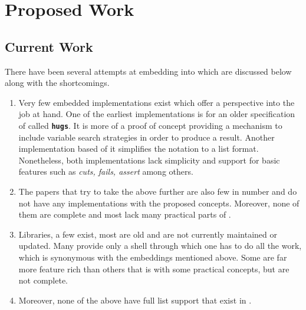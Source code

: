 \documentclass[proposal.tex]{subfiles}
\begin{document}
\chapter{Proposed Work}\label{chap:proposedWork}
\section{Current Work}

There have been several attempts at embedding  into  which are discussed below along with the 
shortcomings.

\begin{enumerate}
\item Very few embedded implementations exist which offer a perspective into the job at hand. One of the earliest implementations 
\cite{website:mini-prolog-hugs98} is for an older specification of  called  
\texttt{\bfseries{hugs}}. It is more of a proof of concept providing a mechanism to include variable search strategies in order to produce 
a result. Another implementation \cite{website:takashi-workplace} based of it simplifies the notation to a list format. Nonetheless, both 
implementations lack simplicity and support for basic  features such as \textit{cuts, fails, assert} among others.   

\begin{comment}
\item Only two embeddings exist, one of them is old and made for \texttt{\bfseries{hugs}} a functional programming system based on the 
\progLang{Haskell 98} specification. It is complex and also lacks a lot of \progLang{Prolog} like features including \textit{cuts, fails, 
assert} among others. The second one is based off the first one to make it simple but it loses the variable search strategy support which 
allows the programmer to choose the manner in which a solution is produced. 
\end{comment}

\item The papers that try to take the above further are also few in number and do not have any implementations with the proposed 
concepts. Moreover, none of them are complete and most lack many practical parts of .

\item Libraries, a few exist, most are old and are not currently maintained or updated. Many provide only a shell through which one has to do all the work, 
which is synonymous with the embeddings mentioned above. Some are far more feature rich than others that is with some practical  
concepts, but are not complete.

\item Moreover, none of the above have full list support that exist in .
\end{enumerate}
\end{document}
